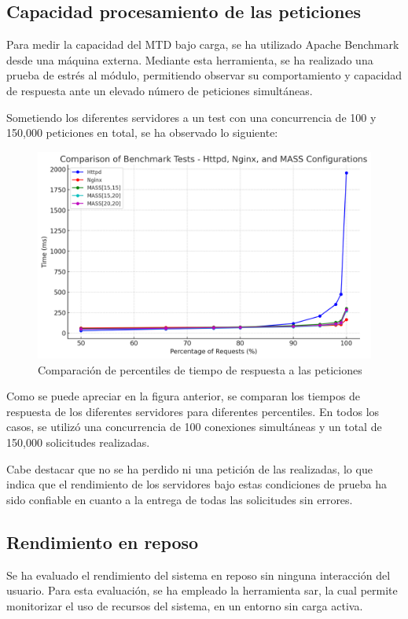 \subsection{Capacidad procesamiento de las peticiones}
Para medir la capacidad del MTD bajo carga, se ha utilizado Apache Benchmark desde una máquina externa. Mediante esta herramienta, se ha realizado una prueba de estrés al módulo, permitiendo observar su comportamiento y capacidad de respuesta ante un elevado número de peticiones simultáneas.

Sometiendo los diferentes servidores a un test con una concurrencia de 100 y 150,000 peticiones en total, se ha observado lo siguiente:

\begin{figure}[h]
    \centering
    \includegraphics[width=\linewidth]{./imagenes/comparison.png}
    \caption{Comparación de percentiles de tiempo de respuesta a las peticiones}
\end{figure}

Como se puede apreciar en la figura anterior, se comparan los tiempos de respuesta de los diferentes servidores para diferentes percentiles. En todos los casos, se utilizó una concurrencia de 100 conexiones simultáneas y un total de 150,000 solicitudes realizadas.

Cabe destacar que no se ha perdido ni una petición de las realizadas, lo que indica que el rendimiento de los servidores bajo estas condiciones de prueba ha sido confiable en cuanto a la entrega de todas las solicitudes sin errores.


\subsection{Rendimiento en reposo}
Se ha evaluado el rendimiento del sistema en reposo sin ninguna interacción del usuario. Para esta evaluación, se ha empleado la herramienta sar\cite{sar}, la cual permite monitorizar el uso de recursos del sistema, en un entorno sin carga activa.

